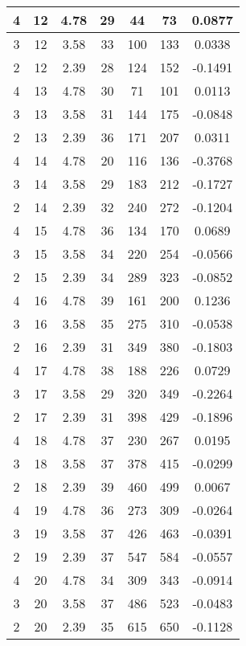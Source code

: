 \documentclass[letterpaper, 12pt]{article}
\begin{document}
\begin{longtable}{|c|c|c|c|c|c|c|}
\hline
4 & 12 & 4.78 & 29 & 44 & 73 & 0.0877 \\
\hline
3 & 12 & 3.58 & 33 & 100 & 133 & 0.0338 \\
\hline
2 & 12 & 2.39 & 28 & 124 & 152 & -0.1491 \\
\hline
4 & 13 & 4.78 & 30 & 71 & 101 & 0.0113 \\
\hline
3 & 13 & 3.58 & 31 & 144 & 175 & -0.0848 \\
\hline
2 & 13 & 2.39 & 36 & 171 & 207 & 0.0311 \\
\hline
4 & 14 & 4.78 & 20 & 116 & 136 & -0.3768 \\
\hline
3 & 14 & 3.58 & 29 & 183 & 212 & -0.1727 \\
\hline
2 & 14 & 2.39 & 32 & 240 & 272 & -0.1204 \\
\hline
4 & 15 & 4.78 & 36 & 134 & 170 & 0.0689 \\
\hline
3 & 15 & 3.58 & 34 & 220 & 254 & -0.0566 \\
\hline
2 & 15 & 2.39 & 34 & 289 & 323 & -0.0852 \\
\hline
4 & 16 & 4.78 & 39 & 161 & 200 & 0.1236 \\
\hline
3 & 16 & 3.58 & 35 & 275 & 310 & -0.0538 \\
\hline
2 & 16 & 2.39 & 31 & 349 & 380 & -0.1803 \\
\hline
4 & 17 & 4.78 & 38 & 188 & 226 & 0.0729 \\
\hline
3 & 17 & 3.58 & 29 & 320 & 349 & -0.2264 \\
\hline
2 & 17 & 2.39 & 31 & 398 & 429 & -0.1896 \\
\hline
4 & 18 & 4.78 & 37 & 230 & 267 & 0.0195 \\
\hline
3 & 18 & 3.58 & 37 & 378 & 415 & -0.0299 \\
\hline
2 & 18 & 2.39 & 39 & 460 & 499 & 0.0067 \\
\hline
4 & 19 & 4.78 & 36 & 273 & 309 & -0.0264 \\
\hline
3 & 19 & 3.58 & 37 & 426 & 463 & -0.0391 \\
\hline
2 & 19 & 2.39 & 37 & 547 & 584 & -0.0557 \\
\hline
4 & 20 & 4.78 & 34 & 309 & 343 & -0.0914 \\
\hline
3 & 20 & 3.58 & 37 & 486 & 523 & -0.0483 \\
\hline
2 & 20 & 2.39 & 35 & 615 & 650 & -0.1128 \\
\hline
\end{longtable}
\end{document}
